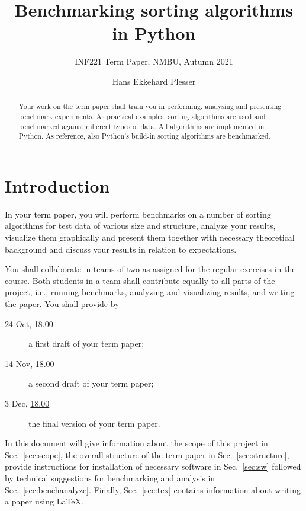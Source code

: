 \documentclass[sigconf, nonacm, natbib, screen, balance=False]{acmart}
\begin{document}
\title{Benchmarking sorting algorithms in Python}
\subtitle{INF221 Term Paper, NMBU, Autumn 2021}

\author{Hans Ekkehard Plesser}

\begin{abstract}
Your work on the term paper shall train you in performing, analysing
and presenting benchmark experiments. As practical examples, sorting
algorithms are used and benchmarked against different types of
data. All algorithms are implemented in Python. As reference, also
Python's build-in sorting algorithms are benchmarked.
\end{abstract}



\maketitle

\section{Introduction}\label{sec:intro}

In your term paper, you will perform benchmarks on a number of sorting
algorithms for test data of various size and structure, analyze your
results, visualize them graphically and present them together with
necessary theoretical background and discuss your results in relation
to expectations.

You shall collaborate in teams of two as assigned for the regular
exercises in the course. Both students in a team shall contribute
equally to all parts of the project, i.e., running benchmarks,
analyzing and visualizing results, and writing the paper. You shall
provide by
\begin{description}
\item[24 Oct, 18.00] a first draft of your term paper; 
\item[14 Nov, 18.00] a second draft of your term paper; 
\item[3 Dec, \underline{18.00}] the final version of your term paper.
\end{description}

In this document will give information about the scope of this
project in Sec.~\ref{sec:scope}, the overall structure of the term
paper in Sec.~\ref{sec:structure}, provide instructions for
installation of necessary software in Sec.~\ref{sec:sw} followed by
technical suggestions for benchmarking and analysis in
Sec.~\ref{sec:benchanalyze}. Finally, Sec.~\ref{sec:tex} contains
information about writing a paper using \LaTeX.
\end{document}
